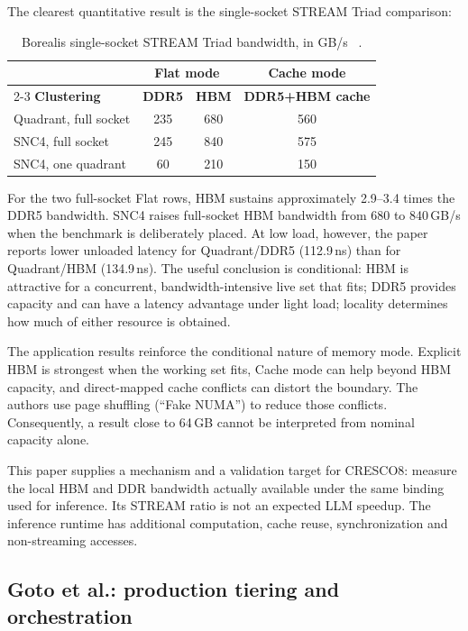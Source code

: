 The clearest quantitative result is the single-socket STREAM Triad
comparison:

\begin{table}[htbp]
\centering
\small
\caption{Borealis single-socket STREAM Triad bandwidth, in GB/s
~\cite{ibeid2025aurora}.}
\label{tab:stream-critical}
\begin{tabular}{@{}lccc@{}}
\toprule
& \multicolumn{2}{c}{\textbf{Flat mode}} & \textbf{Cache mode} \\
\cmidrule(lr){2-3}
\textbf{Clustering} & \textbf{DDR5} & \textbf{HBM} & \textbf{DDR5+HBM cache} \\
\midrule
Quadrant, full socket & 235 & 680 & 560 \\
SNC4, full socket     & 245 & 840 & 575 \\
SNC4, one quadrant    &  60 & 210 & 150 \\
\bottomrule
\end{tabular}
\end{table}

For the two full-socket Flat rows, HBM sustains approximately
2.9--3.4 times the DDR5 bandwidth.  SNC4 raises full-socket HBM
bandwidth from 680 to 840\,GB/s when the benchmark is deliberately
placed.  At low load, however, the paper reports lower unloaded latency
for Quadrant/DDR5 (112.9\,ns) than for Quadrant/HBM (134.9\,ns).  The
useful conclusion is conditional: HBM is attractive for a concurrent,
bandwidth-intensive live set that fits; DDR5 provides capacity and can
have a latency advantage under light load; locality determines how
much of either resource is obtained.

The application results reinforce the conditional nature of memory
mode.  Explicit HBM is strongest when the working set fits, Cache mode
can help beyond HBM capacity, and direct-mapped cache conflicts can
distort the boundary.  The authors use page shuffling (``Fake NUMA'')
to reduce those conflicts.  Consequently, a result close to 64\,GB
cannot be interpreted from nominal capacity alone.

This paper supplies a mechanism and a validation target for CRESCO8:
measure the local HBM and DDR bandwidth actually available under the
same binding used for inference.  Its STREAM ratio is not an expected
LLM speedup.  The inference runtime has additional computation, cache
reuse, synchronization and non-streaming accesses.

\subsection{Goto et al.: production tiering and orchestration}
\label{sec:goto-critical}

